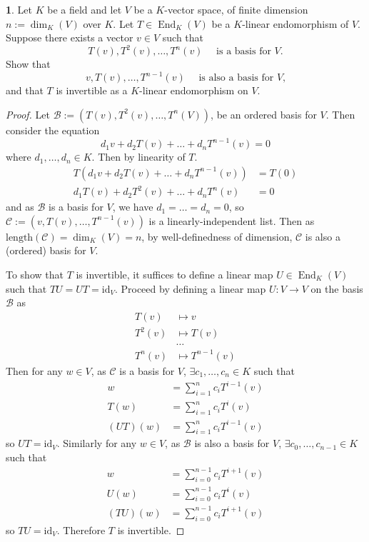 \documentclass{article}
\theoremstyle{definition}
\newtheorem{problem}{}
\numberwithin{lemma}{problem}
\numberwithin{equation}{problem}
\newcommand{\B}{\mathcal{B}}
\DeclareMathOperator{\End}{End}
\begin{document}
\newpage
\begin{problem}
    Let $K$ be a field and let $V$ be a $K$-vector space,
    of finite dimension $n:=\dim_K(V)$ over $K$.
    Let $T \in \End_K(V)$ be a $K$-linear endomorphism of $V$.
    Suppose there exists a vector $v \in V$ such that
    \[ T(v), T^2(v),\dots, T^n(v)\quad\text{ is a basis for $V$.} \]
    Show that
    \[ v,T(v), \dots, T^{n-1}(v)\quad\text{ is also a basis for $V$,} \]
    and that $T$ is invertible as a $K$-linear endomorphism on $V$.
\end{problem}
\begin{proof}
    Let $\mathcal{B} := \left(T(v), T^2(v),\dots, T^n(V)\right)$,
    be an ordered basis for $V$.
    Then consider the equation
    \begin{equation}
        d_1 v + d_2 T(v) + \dots + d_{n} T^{n-1}(v) = 0
    \end{equation}
    where $d_1, \dots, d_n \in K$. Then by linearity of $T$.
    \begin{align*}
        T\left(d_1 v + d_2 T(v) + \dots + d_n T^{n-1}(v)\right) &= T(0)    \\
        d_1T(v) + d_2 T^2(v) + \dots + d_n T^n(v) &= 0
    \end{align*}
    and as $\B$ is a basis for $V$, we have $d_1 = \dots = d_n = 0$, so
    $\mathcal{C} := \left(v, T(v),\dots, T^{n-1}(v)\right)$ is a linearly-independent list.
    Then as $\text{length}(\mathcal{C}) = \dim_K(V) = n$, by well-definedness of dimension,
    $\mathcal{C}$ is also a (ordered) basis for $V$.

    To show that $T$ is invertible, it suffices to define a linear map $U\in\End_K(V)$ such that
    $TU = UT = \text{id}_V$.
    Proceed by defining a linear map $U: V \to V$ on the basis $\B$ as
    \begin{align*}
        T(v) &\mapsto v\\
        T^2(v) &\mapsto T(v)\\
        &\dots\\
        T^n(v) &\mapsto T^{n-1}(v)
    \end{align*}
    Then for any $w\in V$, as $\mathcal{C}$ is a basis for $V$, $\exists c_1,\dots,c_{n} \in K$ such that
    \begin{align*}
        w &= \sum_{i=1}^{n} c_{i} T^{i-1}(v)  \\
        T(w) &= \sum_{i=1}^{n} c_{i} T^{i}(v) \\
        (UT)(w) &= \sum_{i=1}^{n} c_{i} T^{i-1}(v)
    \end{align*}
    so $UT = \text{id}_V$.
    Similarly for any $w \in V$, as $\mathcal{B}$ is also a basis for $V$, $\exists c_0, \dots, c_{n-1} \in K$ such that
    \begin{align*}
        w &= \sum_{i=0}^{n-1} c_i T^{i+1}(v)    \\
        U(w) &= \sum_{i=0}^{n-1} c_i T^{i}(v)    \\
        (TU)(w) &= \sum_{i=0}^{n-1} c_i T^{i+1}(v)
    \end{align*}
    so $TU = \text{id}_V$.
    Therefore $T$ is invertible.
\end{proof}
\end{document}
